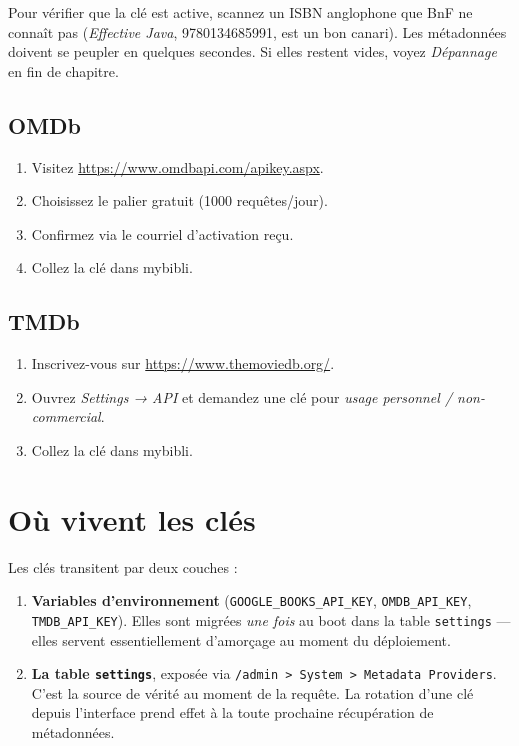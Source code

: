 Pour vérifier que la clé est active, scannez un ISBN anglophone
que BnF ne connaît pas (\emph{Effective Java}, 9780134685991, est
un bon canari). Les métadonnées doivent se peupler en quelques
secondes. Si elles restent vides, voyez \emph{Dépannage} en fin
de chapitre.

\subsection*{OMDb}

\begin{enumerate}
  \item Visitez \url{https://www.omdbapi.com/apikey.aspx}.
  \item Choisissez le palier gratuit (1000 requêtes/jour).
  \item Confirmez via le courriel d'activation reçu.
  \item Collez la clé dans mybibli.
\end{enumerate}

\subsection*{TMDb}

\begin{enumerate}
  \item Inscrivez-vous sur \url{https://www.themoviedb.org/}.
  \item Ouvrez \emph{Settings → API} et demandez une clé pour
        \emph{usage personnel / non-commercial}.
  \item Collez la clé dans mybibli.
\end{enumerate}

\section{Où vivent les clés}

Les clés transitent par deux couches :

\begin{enumerate}
  \item \textbf{Variables d'environnement} (\texttt{GOOGLE\_BOOKS\_API\_KEY},
        \texttt{OMDB\_API\_KEY}, \texttt{TMDB\_API\_KEY}). Elles sont
        migrées \emph{une fois} au boot dans la table
        \texttt{settings} — elles servent essentiellement
        d'amorçage au moment du déploiement.
  \item \textbf{La table \texttt{settings}}, exposée via
        \texttt{/admin > System > Metadata Providers}. C'est la
        source de vérité au moment de la requête. La rotation d'une
        clé depuis l'interface prend effet à la toute prochaine
        récupération de métadonnées.
\end{enumerate}

